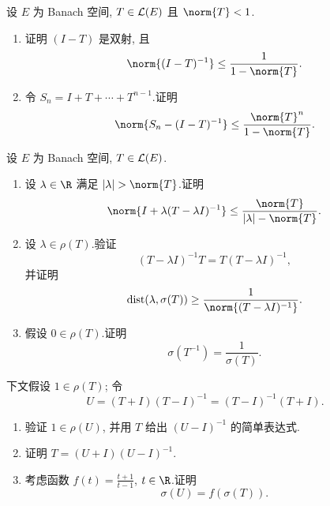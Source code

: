 \begin{exercise}
\label{exer:6.14}
设 $E$ 为 Banach 空间, $T\in\mathcal{L}(E)$ 且 $\norm{T}<1$.
\begin{enumerate}[label=\arabic*., leftmargin=2.2em, itemsep=0.3em]
	\item 证明 $(I-T)$ 是双射, 且
	      \begin{equation*}
	      \norm{(I-T)^{-1}}\le\frac{1}{1-\norm{T}}.
	      \end{equation*}
	\item 令 $S_n=I+T+\cdots+T^{n-1}$.证明
	      \begin{equation*}
	      \norm{S_n-(I-T)^{-1}}\le\frac{\norm{T}^n}{1-\norm{T}}.
	      \end{equation*}
\end{enumerate}
\end{exercise}

\begin{exercise}
\label{exer:6.15}
设 $E$ 为 Banach 空间, $T\in\mathcal{L}(E)$.
\begin{enumerate}[label=\arabic*., leftmargin=2.2em, itemsep=0.3em]
	\item 设 $\lambda\in\R$ 满足 $\abs{\lambda}>\norm{T}$.证明
	      \begin{equation*}
	      \norm{I+\lambda(T-\lambda I)^{-1}}\le\frac{\norm{T}}{\abs{\lambda}-\norm{T}}.
	      \end{equation*}
	\item 设 $\lambda\in\rho(T)$.验证
	      \begin{equation*}
	      (T-\lambda I)^{-1}T=T(T-\lambda I)^{-1},
	      \end{equation*}
	      并证明
	      \begin{equation*}
	      \dist(\lambda,\sigma(T))\ge\frac{1}{\norm{(T-\lambda I)^{-1}}}.
	      \end{equation*}
	\item 假设 $0\in\rho(T)$.证明
	      \begin{equation*}
	      \sigma(T^{-1})=\frac{1}{\sigma(T)}.
	      \end{equation*}
\end{enumerate}

下文假设 $1\in\rho(T)$; 令
\begin{equation*}
U=(T+I)(T-I)^{-1}=(T-I)^{-1}(T+I).
\end{equation*}

\begin{enumerate}[label=\arabic*., leftmargin=2.2em, start=4, itemsep=0.3em]
	\item 验证 $1\in\rho(U)$, 并用 $T$ 给出 $(U-I)^{-1}$ 的简单表达式.
	\item 证明 $T=(U+I)(U-I)^{-1}$.
	\item 考虑函数 $f(t)=\frac{t+1}{t-1}$, $t\in\R$.证明
	      \begin{equation*}
	      \sigma(U)=f(\sigma(T)).
	      \end{equation*}
\end{enumerate}
\end{exercise}

